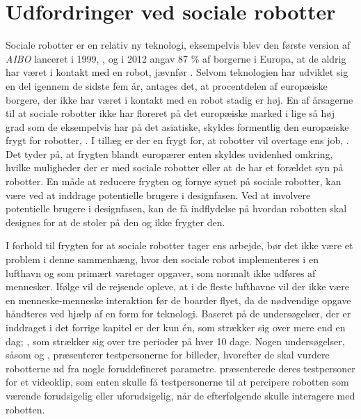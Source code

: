 \section{Udfordringer ved sociale robotter}
\label{UdfordringerSocialeRobotter}
%
Sociale robotter er en relativ ny teknologi, eksempelvis blev den første version af \textit{AIBO} lanceret i 1999, \textcite{WEB:AIBO}, og i 2012 angav 87 \% af borgerne i Europa, at de aldrig har været i kontakt med en robot, jævnfør . Selvom teknologien har udviklet sig en del igennem de sidste fem år, antages det, at procentdelen af europæiske borgere, der ikke har været i kontakt med en robot stadig er høj. En af årsagerne til at sociale robotter ikke har floreret på det europæiske marked i lige så høj grad som de eksempelvis har på det asiatiske, skyldes formentlig den europæiske frygt for robotter, \parencite[s. 28]{PDF:InTheCompanyofRobots}. I tillæg er der en frygt for, at robotter vil overtage ens job, \parencite[s. 42]{PDF:PerceptionAcceptance}. Det tyder på, at frygten blandt europærer enten skyldes uvidenhed omkring, hvilke muligheder der er med sociale robotter eller at de har et forældet syn på robotter. En måde at reducere frygten og fornye synet på sociale robotter, kan være ved at inddrage potentielle brugere i designfasen. Ved at involvere potentielle brugere i designfasen, kan de få indflydelse på hvordan robotten skal designes for at de stoler på den og ikke frygter den.      

I forhold til frygten for at sociale robotter tager ens arbejde, bør det ikke være et problem i denne sammenhæng, hvor den sociale robot implementeres i en lufthavn og som primært varetager opgaver, som normalt ikke udføres af mennesker. Ifølge \textcite[s. 352]{PDF:TheImpactOfTraveler} vil de rejsende opleve, at i de fleste lufthavne vil der ikke være en menneske-menneske interaktion før de boarder flyet, da de nødvendige opgave håndteres ved hjælp af en form for teknologi. \blankline
%
Baseret på de undersøgelser, der er inddraget i det forrige kapitel er der kun én, som strækker sig over mere end en dag; \textcite[s. 3]{PDF:SharingALifeHarvey}, som strækker sig over tre perioder på hver 10 dage. Nogen undersøgelser, såsom \textcite[s. 273]{PDF:PerceptionAcceptance} og \textcite[s. 23]{PDF:CloseButNotStuck}, præsenterer testpersonerne for billeder, hvorefter de skal vurdere robotterne ud fra nogle foruddefineret parametre. \textcite[s. 62]{PDF:PerceptionAcceptance} præsenterede deres testpersoner for et videoklip, som enten skulle få testpersonerne til at percipere robotten som værende forudsigelig eller uforudsigelig, når de efterfølgende skulle interagere med robotten. 

